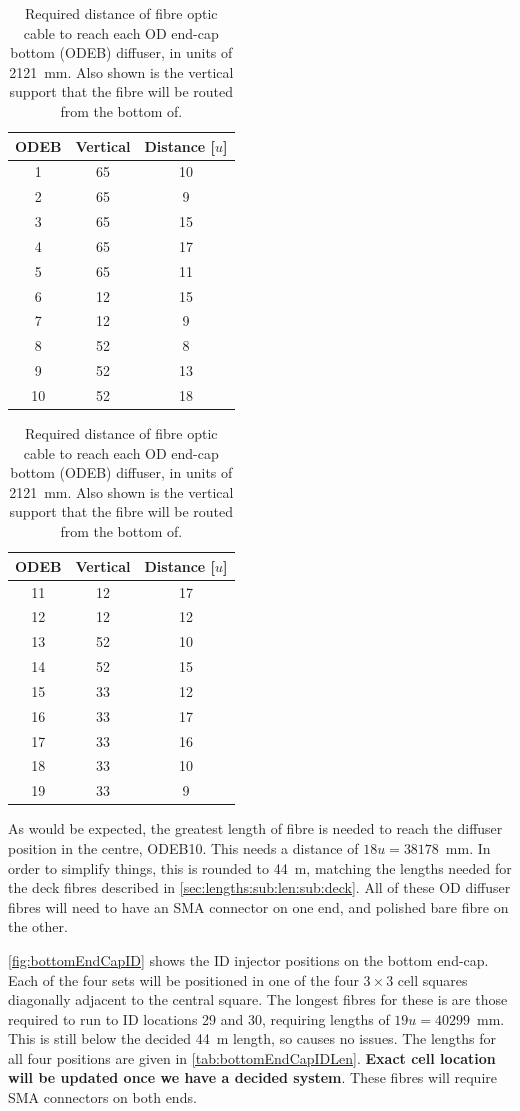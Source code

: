 \documentclass[a4paper,11pt]{article}
\begin{document}
\begin{table}[h!]
\centering
\begin{tabular}[t]{ccc}\toprule
ODEB	&	Vertical	&	Distance [$u$]	\\ \midrule
1		&		65		&	10		\\
2		&		65		&	9		\\
3		&		65		&	15		\\
4		&		65		&	17		\\
5		&		65		&	11		\\
6		&		12		&	15		\\
7		&		12		&	9		\\
8		&		52		&	8		\\
9		&		52		&	13		\\
10		&		52		&	18		\\	\bottomrule
\end{tabular}
\hspace{1cm}
\begin{tabular}[t]{ccc}\toprule
ODEB	&	Vertical	&	Distance [$u$]	\\ \midrule
11		&		12		&	17		\\
12		&		12		&	12		\\
13		&		52		&	10		\\
14		&		52		&	15		\\
15		&		33		&	12		\\
16		&		33		&	17		\\
17		&		33		&	16		\\
18		&		33		&	10		\\
19		&		33		&	9		\\	\bottomrule
\end{tabular}
\caption{Required distance of fibre optic cable to reach each OD end-cap bottom (ODEB) diffuser, in units of 2121~mm. Also shown is the vertical support that the fibre will be routed from the bottom of.}\label{tab:bottomEndCapLen}
\end{table}
As would be expected, the greatest length of fibre is needed to reach the diffuser position in the centre, ODEB10. This needs a distance of $18u = 38178$~mm. In order to simplify things, this is rounded to 44~m, matching the lengths needed for the deck fibres described in \cref{sec:lengths:sub:len:sub:deck}. All of these OD diffuser fibres will need to have an SMA connector on one end, and polished bare fibre on the other.

\cref{fig:bottomEndCapID} shows the ID injector positions on the bottom end-cap. Each of the four sets will be positioned in one of the four $3\times 3$ cell squares diagonally adjacent to the central square. The longest fibres for these is are those required to run to ID locations 29 and 30, requiring lengths of $19u=40299$~mm. This is still below the decided 44~m length, so causes no issues. The lengths for all four positions are given in \cref{tab:bottomEndCapIDLen}. {\bf Exact cell location will be updated once we have a decided system}. These fibres will require SMA connectors on both ends.
\end{document}
